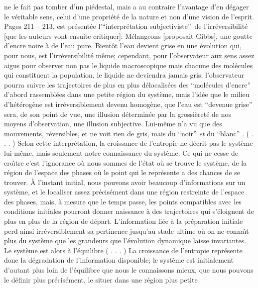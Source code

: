 ne le fait pas tomber d'un pi\'edestal, mais a au contraire l'avantage 
d'en d\'egager le v\'eritable sens, celui d'une propri\'et\'e de la nature 
et non d'une vision de l'esprit. 
\medskip
Pages 211 -- 213, est pr\'esent\'ee l'``{interpr\'etation subjectiviste}''\
de l'irr\'e\-ver\-si\-bi\-lit\'e [que les auteurs vont ensuite critiquer]: 
\medskip
{\cit  M\'elangeons [proposait Gibbs], une goutte d'encre noire \`a de
l'eau pure. Bient\^ot l'eau devient grise en une \'evolution qui, pour nous, 
est l'irr\'eversibilit\'e m\^eme; cependant, pour l'observateur aux sens 
assez aigus pour observer non pas le liquide macroscopique mais chacune 
des mol\'ecules qui constituent la population, le liquide ne deviendra 
jamais gris; l'observateur pourra suivre les trajectoires de plus en plus 
d\'elocalis\'ees des ``{mol\'ecules d'encre}'' d'abord rassembl\'ees
dans une petite r\'egion du syst\`eme, mais l'id\'ee que le milieu 
d'h\'et\'erog\`ene est irr\'eversiblement devenu homog\`ene, que l'eau 
est ``{devenue grise}'' sera, de son point de vue, une illusion
d\'etermin\'ee par la grossi\`eret\'e de nos moyens d'observation, une 
illusion subjective. Lui-m\^eme n'a vu que des mouvements, r\'eversibles, 
et ne voit rien de gris, mais du ``{noir}'' {\it et} du ``{blanc}'' .
( . . .  ) Selon cette interpr\'etation, la croissance de l'entropie ne
d\'ecrit pas le syst\`eme lui-m\^eme, mais seulement notre connaissance 
du syst\`eme. Ce qui ne cesse de cro{\^\i}tre c'est l'ignorance o\`u nous 
sommes de l'\'etat o\`u se trouve le syst\`eme, de la r\'egion de l'espace 
des phases o\`u le point qui le repr\'esente a des chances de se trouver. 
\`A l'instant initial, nous pouvons avoir beaucoup d'informations sur un 
syst\`eme, et le localiser assez pr\'ecis\'ement dans une r\'egion 
restreinte de l'espace des phases, mais, \`a mesure que le temps passe, 
les points compatibles avec les conditions initiales pourront donner 
naissance \`a des trajectoires qui s'\'eloignent de plus en plus de la 
r\'egion de d\'epart. L'information li\'ee \`a la pr\'eparation initiale 
perd ainsi irr\'eversiblement sa pertinence jusqu'au stade ultime o\`u 
on ne conna{\^\i}t plus du syst\`eme que les grandeurs que l'\'evolution 
dynamique laisse invariantes. Le syst\`eme est alors \`a l'\'equilibre 
( . . .  ) La croissance de l'entropie repr\'esente donc la d\'egradation
de l'information disponible; le syst\`eme est initialement d'autant 
plus loin de l'\'equilibre que nous le connaissons mieux, que nous pouvons 
le d\'efinir plus pr\'ecis\'ement, le situer dans une r\'egion plus petite 
}
